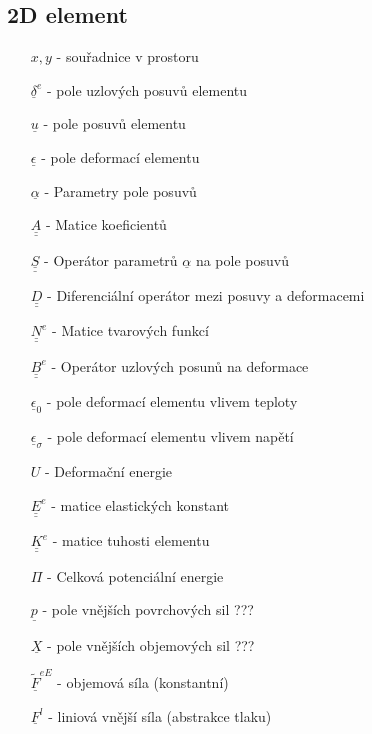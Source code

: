 \documentclass[10pt,oneside]{article}
\newcommand{\ul}[1]{\underline{#1}}
\newcommand{\ull}[1]{\underline{\underline{#1}}}
\begin{document}
\newpage
\subsection*{2D element}
\begin{multicols}{2}
\begin{itemize}
	\item [$x,y$] - souřadnice v prostoru
	\item [$\ul{\delta}^e$] - pole uzlových posuvů elementu
	\\[-.5em]
	\item [$\ul{u}$] - pole posuvů elementu
	\item [$\ul{\epsilon}$] - pole deformací elementu
	\\[-.5em]
	\item [$\ul{\alpha}$] - Parametry pole posuvů
	\item [$\ull{A}$] - Matice koeficientů
	\item [$\ull{S}$] - Operátor parametrů $\ul{\alpha}$ na pole posuvů
	\item [$\ull{D}$] - Diferenciální operátor mezi posuvy a deformacemi
	\\[-.5em]
	\item [$\ull{N}^e$] - Matice tvarových funkcí
	\item [$\ull{B}^e$] - Operátor uzlových posunů na deformace
	\\[-.5em]
	\item [$\ul{\epsilon}_0$] - pole deformací elementu vlivem teploty
	\item [$\ul{\epsilon}_\sigma$] - pole deformací elementu vlivem napětí
	\\[-.5em]
	\item [$U$] - Deformační energie
	\item [$\ull{E}^e$] - matice elastických konstant 
	\item [$\ull{K}^e$] - matice tuhosti elementu
	\\[-.5em]
	\item [$\Pi$] - Celková potenciální energie
	\item [$\ul{p}$] - pole vnějších povrchových sil ???
	\item [$\ul{X}$] - pole vnějších objemových sil ???
	\\[-.5em]
	\item [$\ul{\tilde{F}}^{eE}$] - objemová síla (konstantní)
	\item [$\ul{F}^{l}$] - liniová vnější síla (abstrakce tlaku)
\end{itemize}
\end{multicols}
\end{document}
